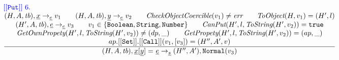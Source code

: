\[\begin{array}{l@{~~}l@{~~}ll}
{\inblue {\tt[[Put]]}\ 6.}\\
\frac{\begin{matrix}
\evale, \irid \rightarrow_{\ir\expr} v_1
\rulesep
\evale, \ir{y} \rightarrow_{\ir\expr} v_2
\rulesep
\hf{CheckObjectCoercible}(v_1) \not= \err
\rulesep
\hf{ToObject}(H, v_1) = (H',l)
\\
(H', A, \tb), \irexpr \rightarrow_{\ir\expr} v_3
\rulesep
v_1 \in \{{\tt Boolean, String, Number}\}
\rulesep
\hf{CanPut}(H', l, \hf{ToString}(H', v_2)) = \true
\\
\hf{GetOwnPropety}(H', l, \hf{ToString}(H', v_2)) \not= (dp, \_)
\rulesep
\hf{GetPropety}(H', l, \hf{ToString}(H', v_2)) = (ap, \_)
\\
ap.{\tt[[Set]]}.{\tt[[Call]]}(v_1, [v_3]) = (H'', A', v)
\end{matrix}}{\begin{matrix}
\state, \irid{\tt[}\ir{y}{\tt] =} \ \irexpr \rightarrow_{\ir\stmt}
(H'',A'), {\tt Normal}(v_3)
\end{matrix}}
\\[2em]





\end{array}\]
